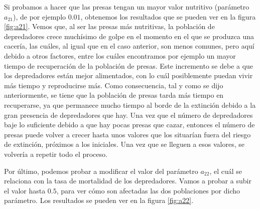 \documentclass[11pt,a4paper]{article}
\begin{document}
Si probamos a hacer que las presas tengan un mayor valor nutritivo (parámetro $a_{21}$), de por ejemplo
$0.01$, obtenemos los resultados que se pueden ver en la figura \ref{fig:a21}.
Vemos que, al ser las presas más nutritivas, la población de depredadores crece muchísimo
de golpe en el momento en el que se produzca una cacería, las cuáles, al igual que en el caso
anterior, son menos comunes, pero aquí debido a otros factores, entre los cuáles encontramos
por ejemplo un mayor tiempo de recuperación de la población de presas. Este incremento se debe
a que los depredadores están mejor alimentados, con lo cuál posiblemente puedan vivir más tiempo
y reproducirse más. Como consecuencia, tal y como se dijo anteriormente, se tiene que la
población de presas tarda más tiempo en recuperarse, ya que permanece mucho tiempo al borde
de la extinción debido a la gran presencia de depredadores que hay. Una vez que el número
de depredadores baje lo suficiente debido a que hay pocas presas que cazar, entonces el
número de presas puede volver a crecer hasta unos valores que los situarían fuera del riesgo de
extinción, próximos a los iniciales. Una vez que se lleguen a esos valores, se volvería a repetir
todo el proceso.

Por último, podemos probar a modificar el valor del parámetro $a_{22}$, el cuál se relaciona
con la tasa de mortalidad de los depredadores. Vamos a probar a subir el valor hasta
$0.5$, para ver cómo son afectadas las dos poblaciones por dicho parámetro. Los resultados
se pueden ver en la figura \ref{fig:a22}.
\end{document}
